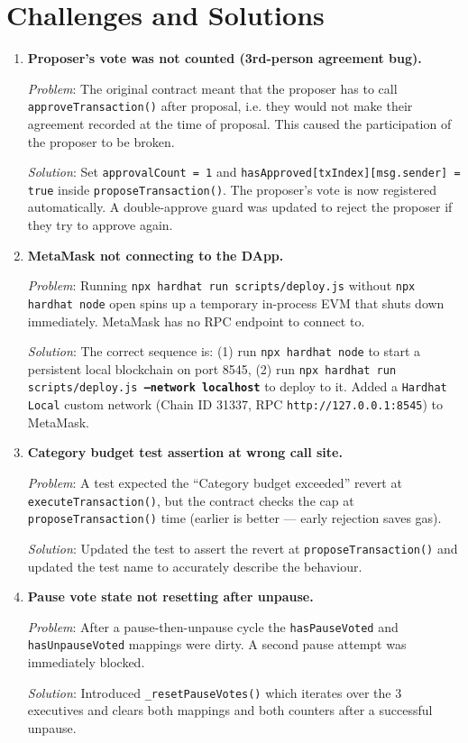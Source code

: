 \documentclass[12pt,a4paper]{article}
\begin{document}
\section{Challenges and Solutions}

\begin{enumerate}

\item \textbf{Proposer's vote was not counted (3rd-person agreement bug).}

  \textit{Problem}: The original contract meant that the proposer has to call \texttt{approveTransaction()} after proposal, i.e. they would not make their agreement recorded at the time of proposal. This caused the participation of the proposer to be broken.

  \textit{Solution}: Set \texttt{approvalCount = 1} and \texttt{hasApproved[txIndex][msg.sender] = true} inside \texttt{proposeTransaction()}. The proposer's vote is now registered automatically. A double-approve guard was updated to reject the proposer if they try to approve again.

\item \textbf{MetaMask not connecting to the DApp.}

  \textit{Problem}: Running \texttt{npx hardhat run scripts/deploy.js} without \texttt{npx hardhat node} open spins up a temporary in-process EVM that shuts down immediately. MetaMask has no RPC endpoint to connect to.

  \textit{Solution}: The correct sequence is: (1) run \texttt{npx hardhat node} to start a persistent local blockchain on port 8545, (2) run \texttt{npx hardhat run scripts/deploy.js \textbf{--network localhost}} to deploy to it. Added a \texttt{Hardhat Local} custom network (Chain ID 31337, RPC \texttt{http://127.0.0.1:8545}) to MetaMask.

\item \textbf{Category budget test assertion at wrong call site.}

  \textit{Problem}: A test expected the ``Category budget exceeded'' revert at \texttt{executeTransaction()}, but the contract checks the cap at \texttt{proposeTransaction()} time (earlier is better — early rejection saves gas).

  \textit{Solution}: Updated the test to assert the revert at \texttt{proposeTransaction()} and updated the test name to accurately describe the behaviour.

\item \textbf{Pause vote state not resetting after unpause.}

  \textit{Problem}: After a pause-then-unpause cycle the \texttt{hasPauseVoted} and \texttt{hasUnpauseVoted} mappings were dirty. A second pause attempt was immediately blocked.

  \textit{Solution}: Introduced \texttt{\_resetPauseVotes()} which iterates over the 3 executives and clears both mappings and both counters after a successful unpause.

\end{enumerate}
\end{document}
